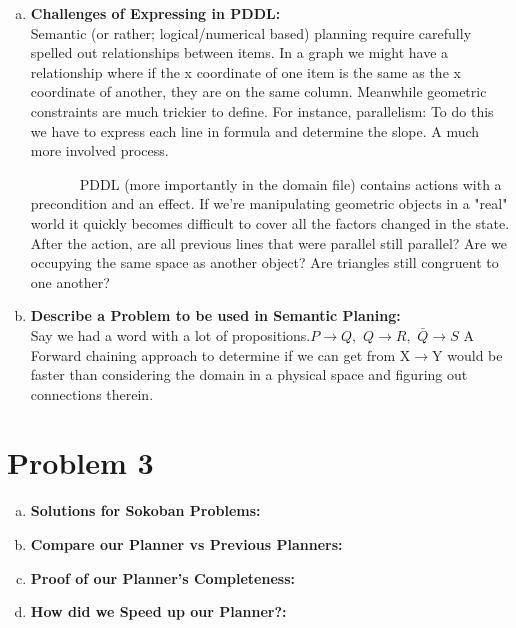 \documentclass[]{article}
\begin{document}
\begin{enumerate}[(a)]
		\item \textbf{Challenges of Expressing in PDDL:}\\
		Semantic (or rather; logical/numerical based) planning require carefully spelled out relationships between items. In a graph we might have a relationship where if the x coordinate of one item is the same as the x coordinate of another, they are on the same column. Meanwhile geometric constraints are much trickier to define. For instance, parallelism: To do this we have to express each line in formula and determine the slope. A much more involved process. 
		
		~~~~~~~PDDL (more importantly in the domain file) contains actions with a precondition and an effect. If we're manipulating geometric objects in a "real" world it quickly becomes difficult to cover all the factors changed in the state. After the action, are all previous lines that were parallel still parallel? Are we occupying the same space as another object? Are triangles still congruent to one another?\\
		\item \textbf{Describe a Problem to be used in Semantic Planing:}\\
		Say we had a word with a lot of propositions.\( P\rightarrow Q,\) \(Q\rightarrow R,\) \(\bar{Q}\rightarrow S\) A Forward chaining approach to determine if we can get from X\(\rightarrow\)Y would be faster than considering the domain in a physical space and figuring out connections therein. 
	\end{enumerate}
\section{Problem 3}
	\begin{enumerate}[(a)]
		\item \textbf{Solutions for Sokoban Problems:}\\
		\item \textbf{Compare our Planner vs Previous Planners:}\\
		\item \textbf{Proof of our Planner's Completeness:}\\
		\item \textbf{How did we Speed up our Planner?:}\\
	\end{enumerate}
	
\end{document}
